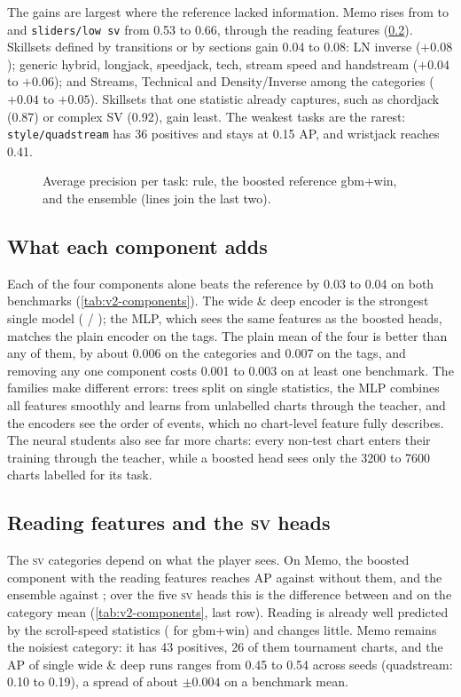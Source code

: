 \documentclass[10pt,twocolumn]{article}
\newcommand{\utag}[1]{\texttt{\small #1}}
\newcommand{\SV}{\textsc{sv}}
\begin{document}
The gains are largest where the reference lacked information. Memo rises from \apMemoBase{} to \apMemoEns{} and \utag{sliders/low sv} from 0.53 to 0.66, through the reading features (\cref{sec:res-reading}). Skillsets defined by transitions or by sections gain 0.04 to 0.08: LN inverse ($+0.08$); generic hybrid, longjack, speedjack, tech, stream speed and handstream ($+0.04$ to $+0.06$); and Streams, Technical and Density/Inverse among the categories ($+0.04$ to $+0.05$). Skillsets that one statistic already captures, such as chordjack (0.87) or complex SV (0.92), gain least. The weakest tasks are the rarest: \utag{style/quadstream} has 36 positives and stays at 0.15 AP, and wristjack reaches 0.41.

\begin{figure}[t]
\centering

\caption{Average precision per task: rule, the boosted reference gbm+win, and the ensemble (lines join the last two).}
\label{fig:pertask}
\end{figure}

\subsection{What each component adds}\label{sec:res-components}

Each of the four components alone beats the reference by 0.03 to 0.04 on both benchmarks (\cref{tab:v2-components}). The wide \& deep encoder is the strongest single model (\catWide{} / \tagWide{}); the MLP, which sees the same features as the boosted heads, matches the plain encoder on the tags. The plain mean of the four is better than any of them, by about 0.006 on the categories and 0.007 on the tags, and removing any one component costs 0.001 to 0.003 on at least one benchmark. The families make different errors: trees split on single statistics, the MLP combines all features smoothly and learns from unlabelled charts through the teacher, and the encoders see the order of events, which no chart-level feature fully describes. The neural students also see far more charts: every non-test chart enters their training through the teacher, while a boosted head sees only the \num{3200} to \num{7600} charts labelled for its task.

\subsection{Reading features and the \SV{} heads}\label{sec:res-reading}
The \SV{} categories depend on what the player sees. On Memo, the boosted component with the reading features reaches \apMemoBoostSv{} AP against \apMemoBoostNoSv{} without them, and the ensemble \apMemoEns{} against \apMemoNoSv{}; over the five \SV{} heads this is the difference between \catEns{} and \catNoSv{} on the category mean (\cref{tab:v2-components}, last row). Reading is already well predicted by the scroll-speed statistics (\apReadingBase{} for gbm+win) and changes little. Memo remains the noisiest category: it has 43 positives, 26 of them tournament charts, and the AP of single wide \& deep runs ranges from 0.45 to 0.54 across seeds (quadstream: 0.10 to 0.19), a spread of about $\pm0.004$ on a benchmark mean.
\end{document}
